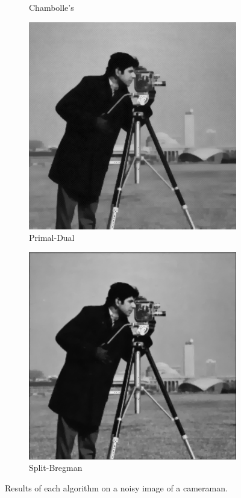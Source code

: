\documentclass[11pt]{article}
\begin{document}
\begin{figure}
\begin{subfigure}[b]{0.4\textwidth}
\caption{Chambolle's}
\label{camera:ch}
\end{subfigure}
\begin{subfigure}[b]{0.4\textwidth}
\centering
\includegraphics[width=\textwidth]{cameraman_10_pd}
\caption{Primal-Dual}
\label{camera:pd}
\end{subfigure}
\begin{subfigure}[b]{0.4\textwidth}
\centering
\includegraphics[width=\textwidth]{cameraman_10_sb}
\caption{Split-Bregman}
\label{camera:sb}
\end{subfigure}
\caption{Results of each algorithm on a noisy image of a cameraman.}
\label{fig:cameraman:dn}
\end{figure}
\end{document}
